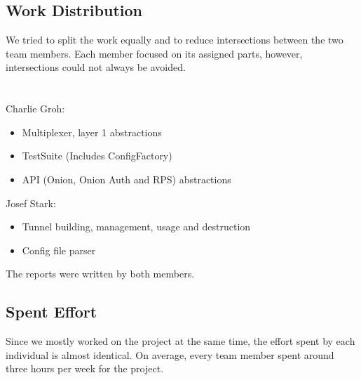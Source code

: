 \documentclass{article}
\begin{document}
\subsection{Work Distribution}
We tried to split the work equally and to reduce intersections between the two team members. Each member focused on its assigned parts, however, intersections could not always be avoided. \\
\\
\\
Charlie Groh:
\begin{itemize}
	\item Multiplexer, layer 1 abstractions
	\item TestSuite (Includes ConfigFactory)
	\item API (Onion, Onion Auth and RPS) abstractions
\end{itemize} 
\hbox{} 
Josef Stark:
\begin{itemize}
	\item Tunnel building, management, usage and destruction
	\item Config file parser
\end{itemize}
\hbox{} 
The reports were written by both members.


\subsection{Spent Effort}
Since we mostly worked on the project at the same time, the effort spent by each individual is
almost identical. On average, every team member spent around three hours per week for the project.
\end{document}
